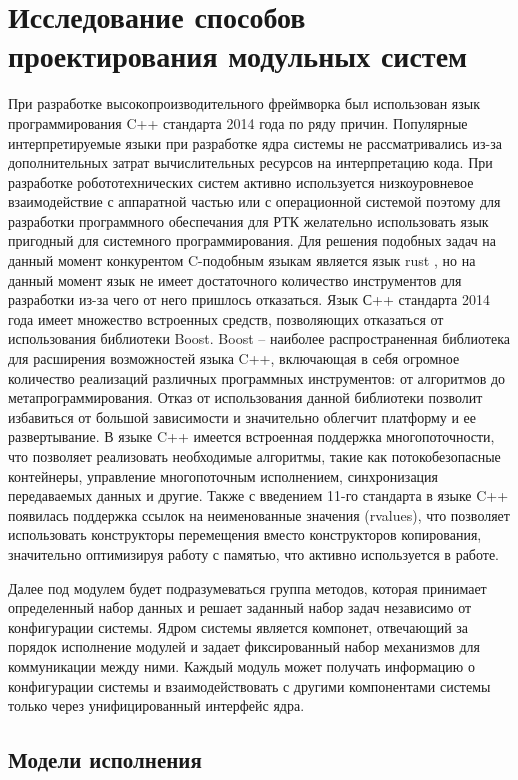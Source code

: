 \section{Исследование способов проектирования модульных систем}

При разработке высокопроизводительного фреймворка был использован язык программирования C++ стандарта 2014 года по ряду причин. Популярные интерпретируемые языки при разработке ядра системы не рассматривались из-за дополнительных затрат вычислительных ресурсов на интерпретацию кода. При разработке робототехнических систем активно используется низкоуровневое взаимодействие с аппаратной частью или с операционной системой поэтому для разработки программного обеспечания для РТК желательно использовать язык пригодный для системного программирования. Для решения подобных задач на данный момент конкурентом C-подобным языкам является язык rust \cite{matsakis2014rust}, но на данный момент язык не имеет достаточного количество инструментов для разработки из-за чего от него пришлось отказаться. Язык С++ стандарта 2014 года имеет множество встроенных средств, позволяющих отказаться от использования библиотеки Boost. Boost – наиболее распространенная библиотека для расширения возможностей языка C++, включающая в себя огромное количество реализаций различных программных инструментов: от алгоритмов до метапрограммирования. Отказ от использования данной библиотеки позволит избавиться от большой зависимости и значительно облегчит платформу и ее развертывание. В языке C++ имеется встроенная поддержка многопоточности, что позволяет реализовать необходимые алгоритмы, такие как потокобезопасные контейнеры, управление многопоточным исполнением, синхронизация передаваемых данных и другие. Также с введением 11-го стандарта в языке C++ появилась поддержка ссылок на неименованные значения (rvalues), что позволяет использовать конструкторы перемещения вместо конструкторов копирования, значительно оптимизируя работу с памятью, что активно используется в работе.

Далее под модулем будет подразумеваться группа методов, которая принимает определенный набор данных и решает заданный набор задач независимо от конфигурации системы. Ядром системы является компонет, отвечающий за порядок исполнение модулей и задает фиксированный набор механизмов для коммуникации между ними. Каждый модуль может получать информацию о конфигурации системы и взаимодействовать с другими компонентами системы только через унифицированный интерфейс ядра.

\subsection{Модели исполнения}


